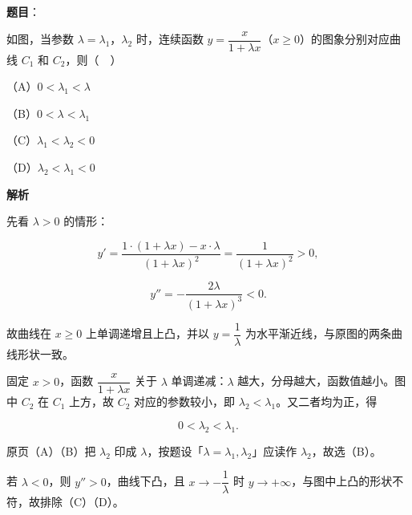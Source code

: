\begin{answer}

\textbf{题目}：

如图，当参数 $\lambda=\lambda_1$，$\lambda_2$ 时，连续函数 $y=\dfrac{x}{1+\lambda x}$（$x\geqslant0$）的图象分别对应曲线 $C_1$ 和 $C_2$，则（　）

（A）$0<\lambda_1<\lambda$

（B）$0<\lambda<\lambda_1$

（C）$\lambda_1<\lambda_2<0$

（D）$\lambda_2<\lambda_1<0$
\nopagebreak[4]
\begin{center}\end{center}
\nopagebreak[4]
\textbf{解析}

先看 $\lambda>0$ 的情形：

\nopagebreak[4]
\[y'=\frac{1\cdot(1+\lambda x)-x\cdot\lambda}{(1+\lambda x)^2}=\frac1{(1+\lambda x)^2}>0,\]

\nopagebreak[4]
\[y''=-\frac{2\lambda}{(1+\lambda x)^3}<0.\]

故曲线在 $x\geqslant0$ 上单调递增且上凸，并以 $y=\dfrac1\lambda$ 为水平渐近线，与原图的两条曲线形状一致。

固定 $x>0$，函数 $\dfrac{x}{1+\lambda x}$ 关于 $\lambda$ 单调递减：$\lambda$ 越大，分母越大，函数值越小。图中 $C_2$ 在 $C_1$ 上方，故 $C_2$ 对应的参数较小，即 $\lambda_2<\lambda_1$。又二者均为正，得

\nopagebreak[4]
\[0<\lambda_2<\lambda_1.\]

原页（A）（B）把 $\lambda_2$ 印成 $\lambda$，按题设「$\lambda=\lambda_1,\lambda_2$」应读作 $\lambda_2$，故选（B）。

若 $\lambda<0$，则 $y''>0$，曲线下凸，且 $x\to-\dfrac1\lambda$ 时 $y\to+\infty$，与图中上凸的形状不符，故排除（C）（D）。


\end{answer}
